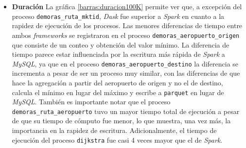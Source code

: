 \begin{itemize}
	\item \textbf{Duración} La gráfica \ref{barras:duracion100K} permite ver que, a excepción del proceso \texttt{demoras\_ruta\_mktid}, \textit{Dask} fue superior a \textit{Spark} en cuanto a la rapidez de ejecución de los procesos. Las menores diferencias de tiempo entre ambos \textit{frameworks} se registraron en el proceso \texttt{demoras\_aeropuerto\_origen} que consiste de un conteo y obtención del valor mínimo. La diferencia de tiempo parece estar influenciada por la escritura más rápida de \textit{Spark} a \textit{MySQL}, ya que en el proceso \texttt{demoras\_aeropuerto\_destino} la diferencia se incrementa a pesar de ser un proceso muy similar, con las diferencias de que hace la agregación a partir del aeropuerto de origen y no el de destino, calcula el mínimo en lugar del máximo y escribe a \texttt{parquet} en lugar de \textit{MySQL}. También es importante notar que el proceso \texttt{demoras\_ruta\_aeropuerto} tuvo un mayor tiempo total de ejecución a pesar de que su tiempo de cómputo fue menor, lo que muestra, una vez más, la importancia en la rapidez de escritura. Adicionalmente, el tiempo de ejecución del proceso \texttt{dijkstra} fue casi 4 veces mayor que el de \textit{Spark}.


\end{itemize}

